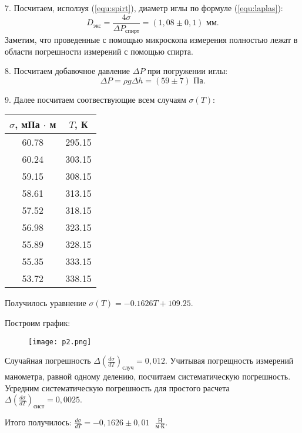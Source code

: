 7. Посчитаем, исползуя (\ref*{equ:spirt}), диаметр иглы по формуле (\ref*{equ:laplas}):
\begin{equation}
  D_\text{экс} = \frac{4\sigma}{\Delta P_\text{спирт}} = (1,08 \pm 0,1)\text{ мм}.
\end{equation}
Заметим, что проведенные с помощью микроскопа измерения полностью лежат в области погрешности измерений с помощью спирта.

8. Посчитаем добавочное давление $\Delta P$ при погружении иглы:
\begin{equation}
  \Delta P = \rho g\Delta h = (59 \pm 7) \text{ Па}.
\end{equation}

9. Далее посчитаем соотвествующие всем случаям $\sigma(T)$:
\begin{center}
\begin{tabular}[h]{|c|c|}
  \hline
  $\sigma$, мПа $\cdot$ м & $T$, К\\
  \hline
   60.78 & 295.15 \\
 \hline
   60.24 & 303.15 \\
 \hline
   59.15 & 308.15 \\
 \hline
   58.61 & 313.15 \\
 \hline
   57.52 & 318.15 \\
 \hline
   56.98 & 323.15 \\
 \hline
   55.89 & 328.15 \\
 \hline
   55.35 & 333.15 \\
 \hline
   53.72 & 338.15 \\
 \hline

\end{tabular}
\end{center}

Получилось уравнение $\sigma(T) = -0.1626T + 109.25$.

Построим график:

\begin{figure}[h]
  \centering
  \texttt{[image: p2.png]}
\end{figure}

Случайная погрешность $\Delta\left(\frac{d\sigma}{dT}\right)_\text{случ} = 0,012$. Учитывая погрещность измерений манометра, равной одному делению, посчитаем систематическую погрешность. Усредним систематическую погрешность для простого расчета $\Delta\left(\frac{d\sigma}{dT}\right)_\text{сист} = 0,0025$.

Итого получилось: $\frac{d\sigma}{dT} = -0,1626 \pm 0,01 \text{ } \frac{\text{Н}}{\text{м}\cdot\text{К}}.$

